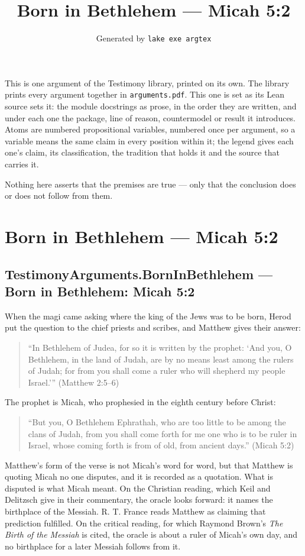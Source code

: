 \documentclass[11pt]{article}
\title{Born in Bethlehem — Micah 5:2}
\author{\credit{TestimonyArguments.BornInBethlehem}}
\date{Generated by \texttt{lake exe argtex}}
\begin{document}
\maketitle
\noindent This is one argument of the Testimony library, printed on its own. The library prints every argument together in \texttt{arguments.pdf}. This one is set as its Lean source sets it: the module docstrings as prose, in the order they are written, and under each one the package, line of reason, countermodel or result it introduces. Atoms are numbered propositional variables, numbered once per argument, so a variable means the same claim in every position within it; the legend gives each one's claim, its classification, the tradition that holds it and the source that carries it.

\noindent Nothing here asserts that the premises are true --- only that the conclusion does or does not follow from them.

\tableofcontents
\clearpage
\section*{Born in Bethlehem — Micah 5:2}

\subsection*{TestimonyArguments.BornInBethlehem — Born in Bethlehem: Micah 5:2}
When the magi came asking where the king of the Jews was to be born, Herod put the question to the chief priests and scribes, and Matthew gives their answer:

\begin{quote}
“In Bethlehem of Judea, for so it is written by the prophet: ‘And you, O Bethlehem, in the land of Judah, are by no means least among the rulers of Judah; for from you shall come a ruler who will shepherd my people Israel.’” (Matthew 2:5–6)

\end{quote}
The prophet is Micah, who prophesied in the eighth century before Christ:

\begin{quote}
“But you, O Bethlehem Ephrathah, who are too little to be among the clans of Judah, from you shall come forth for me one who is to be ruler in Israel, whose coming forth is from of old, from ancient days.” (Micah 5:2)

\end{quote}
Matthew’s form of the verse is not Micah’s word for word, but that Matthew is quoting Micah no one disputes, and it is recorded as a quotation. What is disputed is what Micah meant. On the Christian reading, which Keil and Delitzsch give in their commentary, the oracle looks forward: it names the birthplace of the Messiah. R. T. France reads Matthew as claiming that prediction fulfilled. On the critical reading, for which Raymond Brown’s \emph{The Birth of the Messiah} is cited, the oracle is about a ruler of Micah’s own day, and no birthplace for a later Messiah follows from it.
\end{document}

